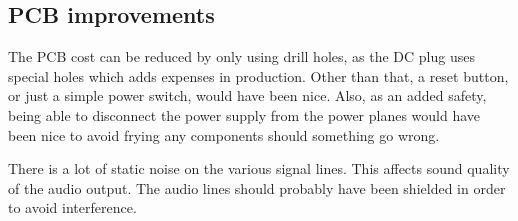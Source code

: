 \subsection{PCB improvements}
The PCB cost can be reduced by only using drill holes, as the DC plug uses
special holes which adds expenses in production. Other than that, a reset
button, or just a simple power switch, would have been nice. Also, as an added
safety, being able to disconnect the power supply from the power planes would
have been nice to avoid frying any components should something go wrong.

There is a lot of static noise on the various signal lines. This affects sound
quality of the audio output. The audio lines
should probably have been shielded in order to avoid interference. 
